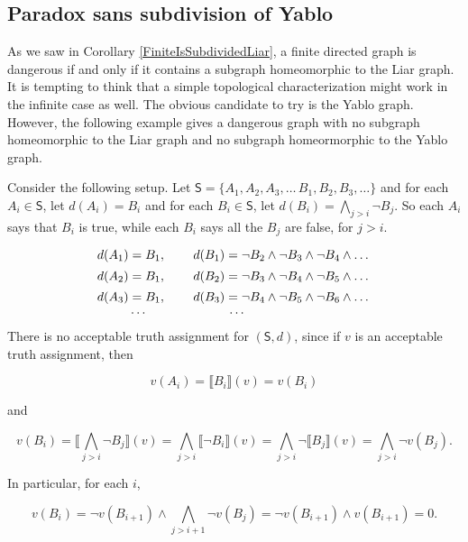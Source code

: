 \documentclass[12pt]{article}
\theoremstyle{remark}
\def\S{\textsf{S}}
\begin{document}

\subsection{Paradox sans subdivision of Yablo}
As we saw in Corollary \ref{FiniteIsSubdividedLiar}, a finite directed graph is dangerous if and only if it contains a subgraph homeomorphic to the Liar graph.  It is tempting to think that a simple topological characterization might work in the infinite case as well.  The obvious candidate to try is the Yablo graph.  However, the following example gives a dangerous graph with no subgraph homeomorphic to the Liar graph and no subgraph homeormorphic to the Yablo graph.\newline

Consider the following setup. Let $\S = \{A_1, A_2, A_3, \dots\, B_1, B_2, B_3, \dots\}$ and for each $A_i \in \S$, let $d(A_i) = B_i$ and for each $B_i \in \S$, let $d(B_i) = \bigwedge_{j > i} \neg B_j$. So each $A_i$ says that $B_i$ is true, while each $B_i$ says all the $B_j$ are false, for $j>i$.
 
\[d(A_1) = B_1, \hspace{.3in} d(B_1) = \neg B_2 \wedge  \neg B_3 \wedge  \neg B_4 \wedge \dots \]
\[d(A_2) = B_1, \hspace{.3in}   d(B_2) =  \neg B_3 \wedge  \neg B_4 \wedge  \neg B_5 \wedge \dots \]
\[d(A_3) = B_1,  \hspace{.3in}  d(B_3) =  \neg B_4 \wedge  \neg B_5 \wedge  \neg B_6 \wedge \dots \]
\[\hspace{-1in} \dots \hspace{.9in}  \dots \]
 
 
There is no acceptable truth assignment for $(\S, d)$, since if $v$ is an acceptable truth assignment, then

\[v(A_i) = \llbracket B_i \rrbracket(v) = v(B_i) \]

and
 
\[v(B_i) = \llbracket \bigwedge_{j > i} \neg B_j \rrbracket(v) = \bigwedge_{j > i} \llbracket \neg B_i \rrbracket(v) = \bigwedge_{j > i} \neg \llbracket B_j \rrbracket(v) = \bigwedge_{j > i} \neg v(B_j).\]
 
In particular, for each $i$,
 
\[v(B_i) = \neg v(B_{i+ 1}) \wedge \bigwedge_{j > i + 1} \neg v(B_j) = \neg v(B_{i + 1}) \wedge v(B_{i + 1}) = 0.\]
 
\end{document}
